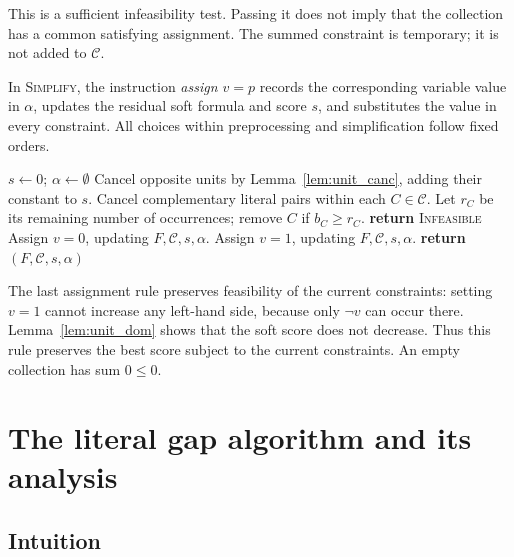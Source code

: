 \documentclass[11pt,a4paper]{article}
\theoremstyle{definition}
\theoremstyle{remark}
\begin{document}
This is a sufficient infeasibility test. Passing it does not imply that
the collection has a common satisfying assignment. The summed constraint
is temporary; it is not added to $\mathcal C$.

In \textnormal{\textsc{Simplify}}, the instruction \emph{assign $v=p$} records the
corresponding variable value in $\alpha$, updates the residual soft formula
and score $s$, and substitutes the value in every constraint. All choices
within preprocessing and simplification follow fixed orders.

\begin{algorithm}[H]
\caption{\textnormal{\textsc{Simplify}}$(F,\mathcal C)$}\label{alg:simplify}
\begin{algorithmic}[1]
\STATE $s\gets0$; $\alpha\gets\emptyset$
  \STATE Cancel opposite units by Lemma~\ref{lem:unit_canc}, adding their constant to $s$.
  \STATE Cancel complementary literal pairs within each $C\in\mathcal C$.
  \STATE Let $r_C$ be its remaining number of occurrences; remove $C$ if $b_C\ge r_C$.
    \STATE \textbf{return} \textsc{Infeasible}
  \ENDIF
    \STATE Assign $v=0$, updating $F,\mathcal C,s,\alpha$.
    \STATE Assign $v=1$, updating $F,\mathcal C,s,\alpha$.
  \ELSE
    \STATE \textbf{return} $(F,\mathcal C,s,\alpha)$
  \ENDIF
\ENDWHILE
\end{algorithmic}
\end{algorithm}

The last assignment rule preserves feasibility of the current constraints:
setting $v=1$ cannot increase any left-hand side, because only $\neg v$ can
occur there. Lemma~\ref{lem:unit_dom} shows that the soft score does not
decrease. Thus this rule preserves the best score subject to the current
constraints. An empty collection has sum $0\le0$.

\section{The literal gap algorithm and its analysis}\label{sec:bias}

\subsection{Intuition}\label{sec:bias_intuition}
\end{document}
